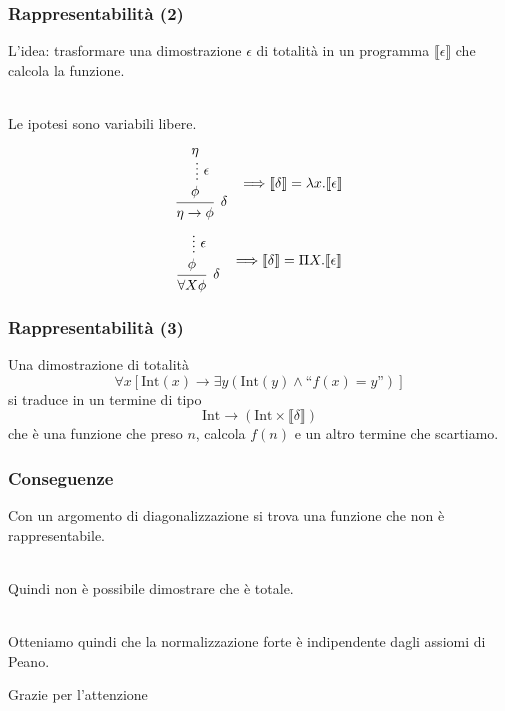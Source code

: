 \documentclass[aspectratio=43]{beamer}
\newcommand{\cod}[1]{\llbracket #1 \rrbracket}
\renewcommand{\l}{\lambda}
\newcommand{\rar}{\rightarrow}
\begin{document}
\begin{frame}
    \frametitle{Rappresentabilit\`a (2)}

    L'idea: trasformare una dimostrazione $\epsilon$ di totalit\`a in un
    programma $\cod{\epsilon}$ che calcola la funzione.
    \\~\

    Le ipotesi sono variabili libere.

    \[
        \begin{prooftree}
            \hypo{\eta}
            \ellipsis{$\epsilon$}{\phi}
            \infer1[$\delta$]{\eta\rar\phi} 
        \end{prooftree}
        \hspace{0.3cm}
        \Longrightarrow \cod{\delta} = \l x. \cod{\epsilon}
    \]
    \vspace{0.5cm}
    \[
        \begin{prooftree}
            \hypo{}
            \ellipsis{$\epsilon$}{\phi}
            \infer1[$\delta$]{\forall X \phi}
        \end{prooftree}
        \hspace{0.3cm}
        \Longrightarrow \cod{\delta} = \Pi X. \cod{\epsilon}
    \]
\end{frame}


\begin{frame}
    \frametitle{Rappresentabilit\`a (3)}
    Una dimostrazione di totalit\`a 
    \[
        \forall x [\text{Int}(x) \rar \exists y ( \text{Int}(y) \land
        \text{``}f(x)=y \text{''})]
    \]
    si traduce in un termine di tipo 
    \[
        \text{Int} \rar ( \text{Int} \times \cod{\delta})
    \]
    che \`e una funzione che preso $n$, calcola $f(n)$ e un altro termine che
    scartiamo.
\end{frame}

\begin{frame}
    \frametitle{Conseguenze}
    Con un argomento di diagonalizzazione si trova una funzione che non \`e
    rappresentabile.
    \\~\

    Quindi non \`e possibile dimostrare che \`e totale.
    \\~\
    
    Otteniamo quindi che la normalizzazione forte \`e indipendente dagli assiomi
    di Peano.
\end{frame}

\begin{frame}
    \begin{center}
        \huge{
            Grazie per l'attenzione
        }
    \end{center}
\end{frame}
\end{document}
